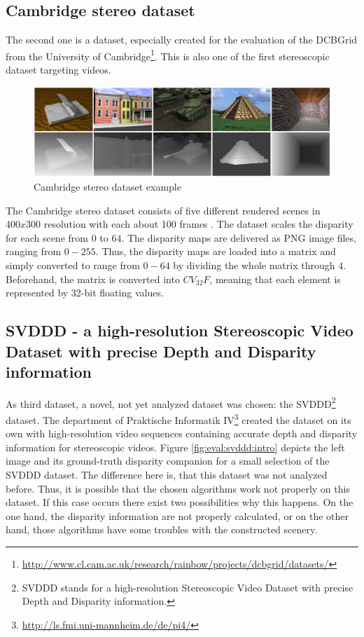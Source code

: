 \subsection*{Cambridge stereo dataset}

The second one is a dataset, especially created for the evaluation of the DCBGrid from the University of Cambridge\footnote{\url{http://www.cl.cam.ac.uk/research/rainbow/projects/dcbgrid/datasets/}}.
This is also one of the first stereoscopic dataset targeting videos.

\begin{figure}[h!]
  \centering
  \includegraphics[width=1.0\textwidth]{src/images/dbcgrid-dataset.png}
  \caption[Cambridge stereo dataset example]{Cambridge stereo dataset example}
  \label{fig:dbcgrid-dataset}
\end{figure}

\noindent The Cambridge stereo dataset consists of five different rendered scenes in $400x300$ resolution with each about 100 frames \citep{richardt2010real}.
The dataset scales the disparity for each scene from $0$ to $64$.
The disparity maps are delivered as PNG image files, ranging from $0-255$.
Thus, the disparity maps are loaded into a matrix and simply converted to range from $0-64$ by dividing the whole matrix through $4$.
Beforehand, the matrix is converted into $CV_32F$, meaning that each element is represented by 32-bit floating values.

\subsection*{SVDDD - a high-resolution Stereoscopic Video Dataset with precise Depth and Disparity information}

As third dataset, a novel, not yet analyzed dataset was chosen: the SVDDD\footnote{SVDDD stands for a high-resolution Stereoscopic Video Dataset with precise Depth and Disparity information.} dataset.
The department of Praktische Informatik IV\footnote{\url{http://ls.fmi.uni-mannheim.de/de/pi4/}} created the dataset on its own with high-resolution video sequences containing accurate depth and disparity information for stereoscopic videos.
Figure \ref{fig:eval:svddd:intro} depicts the left image and its ground-truth disparity companion for a small selection of the SVDDD dataset.
\newline\newline\noindent The difference here is, that this dataset was not analyzed before.
Thus, it is possible that the chosen algorithms work not properly on this dataset.
If this case occurs there exist two possibilities why this happens.
On the one hand, the disparity information are not properly calculated, or on the other hand, those algorithms have some troubles with the constructed scenery.

